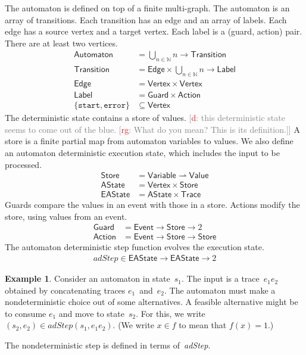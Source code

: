 \documentclass[preprint]{sigplanconf} %
\newcommand{\note}[2]{\textcolor{gray}{[\textcolor{red}{#1}: #2]}}
\newcommand{\rg}[1]{\note{rg}{#1}}
\newcommand{\dd}[1]{\note{d}{#1}}
\newcommand{\dinocomment}[1]{\dd{#1}}
\newcommand{\N}{\ensuremath{\mathbb{N}}}
\newcommand{\pmap}{\rightharpoonup}
\newcommand{\set}[1]{\ensuremath{\mathsf{#1}}}
\theoremstyle{definition}
\newtheorem{example}{Example}
\begin{document}
The automaton is defined on top of a finite multi-graph.
The automaton is an array of transitions.
Each transition has an edge and an array of labels.
Each edge has a source vertex and a target vertex.
Each label is a (guard, action) pair.
There are at least two vertices.
\begin{align}
\set{Automaton} &= \bigcup_{n\in\N} n \to \set{Transition} \\
\set{Transition} &= \set{Edge}\times \bigcup_{n\in\N} n\to\set{Label} \\
\set{Edge}&=\set{Vertex}\times\set{Vertex} \\
\set{Label}&=\set{Guard}\times\set{Action} \\
\{\mathtt{start},\mathtt{error}\}&\subseteq\set{Vertex}
\end{align}
The deterministic state contains a store of values.
\dinocomment{this deterministic state seems to come out of the blue.
\rg{What do you mean?
This is its definition.}}
A store is a finite partial map from automaton variables to values.
We also define an automaton deterministic execution state, which includes the input to be processed.
\begin{align}
\set{Store}&=\set{Variable}\pmap\set{Value} \\
\set{AState}&=\set{Vertex}\times\set{Store} \\
\set{EAState}&=\set{AState}\times\set{Trace}
\end{align}
Guards compare the values in an event with those in a store.
Actions modify the store, using values from an event.
\begin{align}
\set{Guard}&=\set{Event}\to\set{Store}\to2 \\
\set{Action}&=\set{Event}\to\set{Store}\to\set{Store}
\end{align}
The automaton deterministic step function evolves the execution state.
\begin{align}
\mathit{adStep}\in\set{EAState}\to\set{EAState}\to2
\end{align}
\begin{example}
Consider an automaton in state~$s_1$.
The input is a trace~$e_1e_2$ obtained by concatenating traces $e_1$~and~$e_2$.
The automaton must make a nondeterministic choice out of some alternatives.
A feasible alternative might be to consume $e_1$ and move to state~$s_2$.
For this, we write $(s_2,e_2)\in\mathit{adStep}(s_1,e_1e_2)$.
(We write $x\in f$ to mean that $f(x)=1$.)
\end{example}
The nondeterministic step is defined in terms of~\textit{adStep}.
\end{document}
